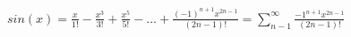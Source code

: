 $sin(x) = \frac{x}{1!} - \frac{x^3}{3!} + \frac{x^5}{5!} - ... + \frac{(-1)^{n+1}x^{2n-1}}{(2n-1)!} = \sum_{n-1}^{\infty}\frac{-1^{n+1}x^{2n-1}}{(2n-1)!}$
